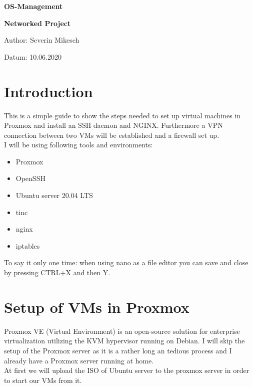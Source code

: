 \documentclass[10pt,a4paper]{article}
\begin{document}
\huge
\begin{center}
{\bf OS-Management}\par
{\bf Networked Project}\par
\vspace{5cm}
\end{center}

\large
Author: Severin Mikesch\par
\vspace{0.8cm}
Datum: 10.06.2020\par
\vspace{0.8cm}

\normalsize


\newpage
\section{Introduction}
This is a simple guide to show the steps needed to set up virtual machines in Proxmox and install an SSH daemon and NGINX. Furthermore a VPN connection between two VMs will be established and a firewall set up.
\\
I will be using following tools and environments:
\begin{itemize}
\item Proxmox
\item OpenSSH
\item Ubuntu server 20.04 LTS
\item tinc
\item nginx
\item iptables
\end{itemize}

To say it only one time: when using nano as a file editor you can save and close by pressing CTRL+X and then Y.

\newpage
\section{Setup of VMs in Proxmox}
Proxmox VE (Virtual Environment) is an open-source solution for enterprise virtualization utilizing the KVM hypervisor running on Debian. I will skip the setup of the Proxmox server as it is a rather long an tedious process and I already have a Proxmox server running at home.
\\
At first we will upload the ISO of Ubuntu server to the proxmox server in order to start our VMs from it.
\end{document}
